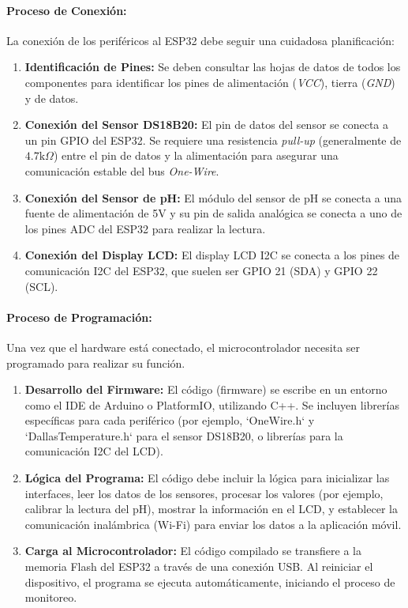 \documentclass[a4paper,12pt]{article}
\begin{document}
	\paragraph{Proceso de Conexión:}
	La conexión de los periféricos al ESP32 debe seguir una cuidadosa planificación:
	\begin{enumerate}
		\item \textbf{Identificación de Pines:} Se deben consultar las hojas de datos de todos los componentes para identificar los pines de alimentación (\textit{VCC}), tierra (\textit{GND}) y de datos.
		\item \textbf{Conexión del Sensor DS18B20:} El pin de datos del sensor se conecta a un pin GPIO del ESP32. Se requiere una resistencia \textit{pull-up} (generalmente de $4.7\text{k}\Omega$) entre el pin de datos y la alimentación para asegurar una comunicación estable del bus \textit{One-Wire}.
		\item \textbf{Conexión del Sensor de pH:} El módulo del sensor de pH se conecta a una fuente de alimentación de 5V y su pin de salida analógica se conecta a uno de los pines ADC del ESP32 para realizar la lectura.
		\item \textbf{Conexión del Display LCD:} El display LCD I2C se conecta a los pines de comunicación I2C del ESP32, que suelen ser GPIO 21 (SDA) y GPIO 22 (SCL).
	\end{enumerate}
	
	\paragraph{Proceso de Programación:}
	Una vez que el hardware está conectado, el microcontrolador necesita ser programado para realizar su función.
	\begin{enumerate}
		\item \textbf{Desarrollo del Firmware:} El código (firmware) se escribe en un entorno como el IDE de Arduino o PlatformIO, utilizando C++. Se incluyen librerías específicas para cada periférico (por ejemplo, `OneWire.h` y `DallasTemperature.h` para el sensor DS18B20, o librerías para la comunicación I2C del LCD).
		\item \textbf{Lógica del Programa:} El código debe incluir la lógica para inicializar las interfaces, leer los datos de los sensores, procesar los valores (por ejemplo, calibrar la lectura del pH), mostrar la información en el LCD, y establecer la comunicación inalámbrica (Wi-Fi) para enviar los datos a la aplicación móvil.
		\item \textbf{Carga al Microcontrolador:} El código compilado se transfiere a la memoria Flash del ESP32 a través de una conexión USB. Al reiniciar el dispositivo, el programa se ejecuta automáticamente, iniciando el proceso de monitoreo.
	\end{enumerate}
	
\end{document}
